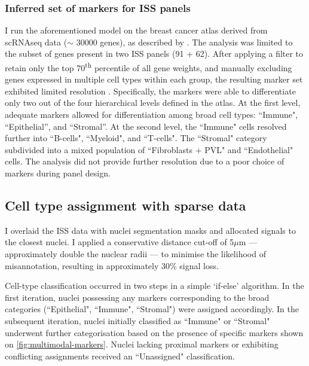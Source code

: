 
\subsubsection*{Inferred set of markers for \ac{ISS} panels}

I run the aforementioned model on the breast cancer atlas derived from \ac{scRNAseq} data ($\sim$ 30000 genes), as described by \textcite{Wu2021-uq}. The analysis was limited to the subset of genes present in two \ac{ISS} panels (91 + 62). After applying a filter to retain only the top 70\textsuperscript{th} percentile of all gene weights, and manually excluding genes expressed in multiple cell types within each group, the resulting marker set exhibited limited resolution . Specifically, the markers were able to differentiate only two out of the four hierarchical levels defined in the atlas. At the first level, adequate markers allowed for differentiation among broad cell types: ``Immune", ``Epithelial'', and ``Stromal''. At the second level, the ``Immune" cells resolved further into ``B-cells", ``Myeloid", and ``T-cells". The ``Stromal" category subdivided into a mixed population of ``Fibroblasts + PVL" and ``Endothelial" cells. The analysis did not provide further resolution due to a poor choice of markers during panel design.

\subsection{Cell type assignment with sparse data}
\label{sec:modalities-celltype}

I overlaid the \ac{ISS} data with nuclei segmentation masks and allocated signals to the closest nuclei. I applied a conservative distance cut-off of 5$\mu$m — approximately double the nuclear radii — to minimise the likelihood of misannotation, resulting in approximately 30\% signal loss.

Cell-type classification occurred in two steps in a simple `if-else' algorithm. In the first iteration, nuclei possessing any markers corresponding to the broad categories (``Epithelial", ``Immune", ``Stromal") were assigned accordingly. In the subsequent iteration, nuclei initially classified as ``Immune" or ``Stromal" underwent further categorisation based on the presence of specific markers shown on \cref{fig:multimodal-markers}. Nuclei lacking proximal markers or exhibiting conflicting assignments received an ``Unassigned" classification. 

